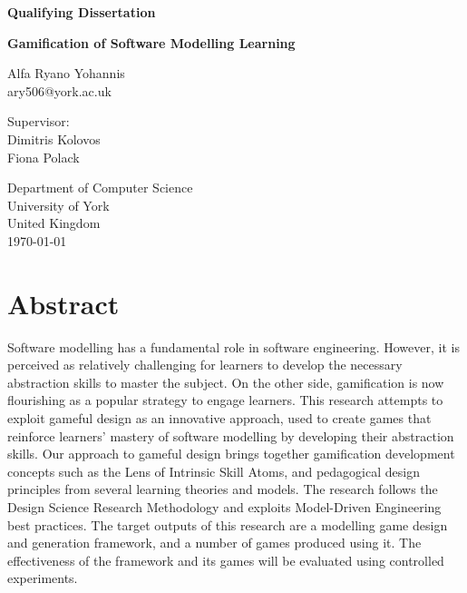 \documentclass[a4paper]{Report}
\begin{document}
\begin{titlepage}
    \begin{center}

\textbf{Qualifying Dissertation}
\vspace{1cm}

\textbf{\large Gamification of Software Modelling Learning}
\vspace{1cm}

Alfa Ryano Yohannis\\
ary506@york.ac.uk
\vspace{1cm}

Supervisor:\\
Dimitris Kolovos\\
Fiona Polack\\
\vspace{1cm}

Department of Computer Science\\
University of York\\
United Kingdom\\
\vspace{1cm}
\today
        
\vfill
         
\end{center}
\end{titlepage}

\tableofcontents

\chapter{Abstract}
Software modelling has a fundamental role in software engineering. However, it is perceived as relatively challenging for learners to develop the necessary abstraction skills to master the subject. On the other side, gamification is now flourishing as a popular strategy to engage learners. This research attempts to exploit gameful design as an innovative approach, used to create games that reinforce learners' mastery of software modelling by developing their abstraction skills. Our approach to gameful design brings together gamification development concepts such as the Lens of Intrinsic Skill Atoms, and pedagogical design principles from several learning theories and models. The research follows the Design Science Research Methodology and exploits Model-Driven Engineering best practices. The target outputs of this research are a modelling game design and generation framework, and a number of games produced using it. The effectiveness of the framework and its games will be evaluated using controlled experiments.
\end{document}
